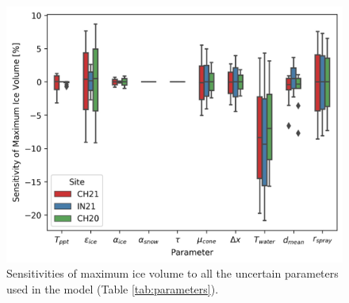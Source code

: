 \documentclass[utf8]{frontiersSCNS} %
\begin{document}
\begin{figure} 
    \begin{center} 
    \includegraphics[width=10 cm]{Figures/sensitivities.jpg} 
\end{center}
\caption{Sensitivities of maximum ice volume to all the uncertain parameters used in the model (Table
\ref{tab:parameters}). } 
\label{fig:sensitivity} 
\end{figure}
 
\end{document}
